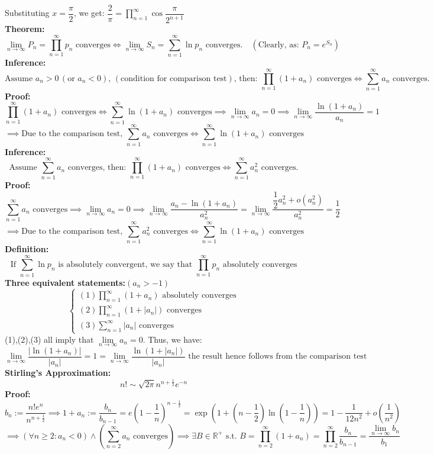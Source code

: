 \documentclass{article}
\newcommand{\0}{{\bf{0}}}
\begin{document}
Substituting $x=\dfrac{\pi}{2}$, we get: $\dfrac{2}{\pi}=\prod\limits_{n=1}^\infty\cos\dfrac{\pi}{2^{n+1}}$\\
\textbf{Theorem:}
$$\lim_{n\to\infty}P_n=\prod_{n=1}^\infty p_n\mbox{ converges}\iff\lim_{n\to\infty}S_n=\sum_{n=1}^\infty\ln p_n\mbox{ converges.}\quad(\mbox{Clearly, as: }P_n=e^{S_n})$$
\textbf{Inference:}
$$\mbox{Assume }a_n>0\,(\mbox{or } a_n<0),\,(\mbox{condition for comparison test})\mbox{, then: }\prod_{n=1}^\infty(1+a_n)\mbox{ converges}\iff\sum_{n=1}^\infty a_n\mbox{ converges.}$$
\textbf{Proof:}
$$\prod_{n=1}^\infty(1+a_n)\mbox{ converges}\iff\sum_{n=1}^\infty\ln(1+a_n)\mbox{ converges}\implies\lim_{n\to\infty}a_n=0\implies\lim_{n\to\infty}\frac{\ln(1+a_n)}{a_n}=1$$
$$\implies\mbox{Due to the comparison test, }\sum_{n=1}^\infty a_n\mbox{ converges}\iff\sum_{n=1}^\infty\ln(1+a_n)\mbox{ converges}$$
\textbf{Inference:}
$$\mbox{Assume }\sum_{n=1}^\infty a_n\mbox{ converges, then: }\prod_{n=1}^\infty(1+a_n)\mbox{ converges}\iff\sum_{n=1}^\infty a_n^2\mbox{ converges.}$$
\textbf{Proof:}
$$\sum_{n=1}^\infty a_n\mbox{ converges}\implies\lim_{n\to\infty}a_n=0\implies\lim_{n\to\infty}\frac{a_n-\ln(1+a_n)}{a_n^2}=\lim_{n\to\infty}\frac{\dfrac{1}{2}a_n^2+o(a_n^2)}{a_n^2}=\frac{1}{2}$$
$$\implies\mbox{Due to the comparison test, }\sum_{n=1}^\infty a_n^2\mbox{ converges}\iff\sum_{n=1}^\infty\ln(1+a_n)\mbox{ converges}$$
\textbf{Definition:}
$$\mbox{If }\sum_{n=1}^\infty \ln p_n\mbox{ is absolutely convergent, we say that }\prod_{n=1}^\infty p_n\mbox{ absolutely converges}$$
\textbf{Three equivalent statements:}\quad\quad$(a_n>-1)$
$$\begin{cases}
    (1)\prod\limits_{n=1}^\infty(1+a_n)\mbox{ absolutely converges}\\
    (2)\prod\limits_{n=1}^\infty(1+|a_n|)\mbox{ converges}\\
    (3)\sum\limits_{n=1}^\infty|a_n|\mbox{ converges}
\end{cases}$$
(1),(2),(3) all imply that $\lim\limits_{n\to\infty}a_n=0$. Thus, we have:
$$\lim_{n\to\infty}\frac{|\ln(1+a_n)|}{|a_n|}=1=\lim_{n\to\infty}\frac{\ln(1+|a_n|)}{|a_n|}\mbox{ the result hence follows from the comparison test}$$
\textbf{Stirling's Approximation:}
$$n!\sim\sqrt{2\pi}n^{n+\frac{1}{2}}e^{-n}$$
\textbf{Proof:}
$$b_n:=\frac{n!e^n}{n^{n+\frac{1}{2}}}\implies1+a_n:=\frac{b_n}{b_{n-1}}=e\left(1-\frac{1}{n}\right)^{n-\frac{1}{2}}=\exp\left(1+\left(n-\frac{1}{2}\right)\ln\left(1-\frac{1}{n}\right)\right)=1-\frac{1}{12n^2}+o\left(\frac{1}{n^2}\right)$$
$$\implies(\forall n\geq2:a_n<0)\land\left(\sum_{n=2}^\infty a_n\mbox{ converges}\right)\implies\exists B\in\mathbb{R}^+\mbox{ s.t. }B=\prod_{n=2}^\infty(1+a_n)=\prod_{n=2}^\infty\frac{b_n}{b_{n-1}}=\frac{\lim\limits_{n\to\infty}b_n}{b_1}$$
\end{document}
